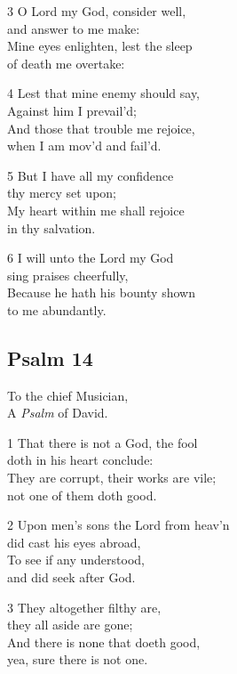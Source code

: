 \begin{multicols}{3}
3 O Lord my God, consider well,\\
and answer to me make:\\
Mine eyes enlighten, lest the sleep\\
of death me overtake:

4 Lest that mine enemy should say,\\
Against him I prevail’d;\\
And those that trouble me rejoice,\\
when I am mov’d and fail’d.

5 But I have all my confidence\\
thy mercy set upon;\\
My heart within me shall rejoice\\
in thy salvation.

6 I will unto the Lord my God\\
sing praises cheerfully,\\
Because he hath his bounty shown\\
to me abundantly.

\begin{center}
\quad{}\quad{}
\end{center}

\subsection*{Psalm 14  }

To the chief Musician,\\
A \emph{Psalm} of David.

1 That there is not a God, the fool\\
doth in his heart conclude:\\
They are corrupt, their works are vile;\\
not one of them doth good.

2 Upon men’s sons the Lord from heav’n\\
did cast his eyes abroad,\\
To see if any understood,\\
and did seek after God.

3 They altogether filthy are,\\
they all aside are gone;\\
And there is none that doeth good,\\
yea, sure there is not one.


\end{multicols}
